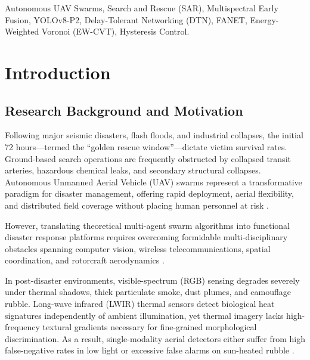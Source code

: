 \documentclass[conference]{IEEEtran}
\begin{document}
\begin{abstract}
accuracy, $3.22\,\text{m}$ RMSE), $98.42\%$ chattering suppression saving $29.49\,\text{kJ}$ of kinetic rotor propulsion energy, and an energy fairness index of $\mathcal{J} = 0.9991$.
\end{abstract}

\begin{IEEEkeywords}
Autonomous UAV Swarms, Search and Rescue (SAR), Multispectral Early Fusion, YOLOv8-P2, Delay-Tolerant Networking (DTN), FANET, Energy-Weighted Voronoi (EW-CVT), Hysteresis Control.
\end{IEEEkeywords}

\section{Introduction}

\subsection{Research Background and Motivation}
Following major seismic disasters, flash floods, and industrial collapses, the initial 72 hours—termed the ``golden rescue window''—dictate victim survival rates. Ground-based search operations are frequently obstructed by collapsed transit arteries, hazardous chemical leaks, and secondary structural collapses. Autonomous Unmanned Aerial Vehicle (UAV) swarms represent a transformative paradigm for disaster management, offering rapid deployment, aerial flexibility, and distributed field coverage without placing human personnel at risk \cite{ref1, ref5, ref6}.

However, translating theoretical multi-agent swarm algorithms into functional disaster response platforms requires overcoming formidable multi-disciplinary obstacles spanning computer vision, wireless telecommunications, spatial coordination, and rotorcraft aerodynamics \cite{ref7, ref8, ref18, ref19}.

In post-disaster environments, visible-spectrum (RGB) sensing degrades severely under thermal shadows, thick particulate smoke, dust plumes, and camouflage rubble. Long-wave infrared (LWIR) thermal sensors detect biological heat signatures independently of ambient illumination, yet thermal imagery lacks high-frequency textural gradients necessary for fine-grained morphological discrimination. As a result, single-modality aerial detectors either suffer from high false-negative rates in low light or excessive false alarms on sun-heated rubble \cite{ref3, ref4}.
\end{document}

